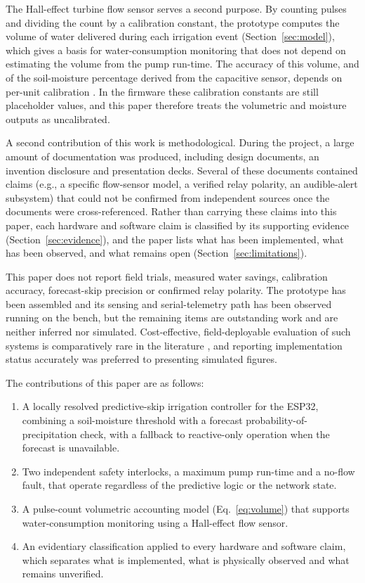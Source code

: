 \documentclass[conference]{IEEEtran}
\begin{document}
The Hall-effect turbine flow sensor serves a second purpose. By counting
pulses and dividing the count by a calibration constant, the prototype
computes the volume of water delivered during each irrigation event
(Section~\ref{sec:model}), which gives a basis for water-consumption
monitoring that does not depend on estimating the volume from the pump
run-time. The accuracy of this volume, and of the soil-moisture percentage
derived from the capacitive sensor, depends on per-unit calibration
\cite{adla2020laboratory,abdelmoneim2025calibration}. In the firmware
these calibration constants are still placeholder values, and this paper
therefore treats the volumetric and moisture outputs as uncalibrated.

A second contribution of this work is methodological. During the project, a
large amount of documentation was produced, including design documents, an
invention disclosure and presentation decks. Several of these documents
contained claims (e.g., a specific flow-sensor model, a verified relay
polarity, an audible-alert subsystem) that could not be confirmed from
independent sources once the documents were cross-referenced. Rather than
carrying these claims into this paper, each hardware and software claim is
classified by its supporting evidence (Section~\ref{sec:evidence}), and the
paper lists what has been implemented, what has been observed, and what
remains open (Section~\ref{sec:limitations}).

This paper does not report field trials, measured water savings, calibration
accuracy, forecast-skip precision or confirmed relay polarity. The prototype
has been assembled and its sensing and serial-telemetry path has been observed
running on the bench, but the remaining items are outstanding work and are
neither inferred nor simulated. Cost-effective, field-deployable evaluation of
such systems is comparatively rare in the literature \cite{jha2019comprehensive},
and reporting implementation status accurately was preferred to presenting
simulated figures.

The contributions of this paper are as follows:
\begin{enumerate}
\item A locally resolved predictive-skip irrigation controller for the ESP32,
combining a soil-moisture threshold with a forecast probability-of-precipitation
check, with a fallback to reactive-only operation when the forecast is
unavailable.
\item Two independent safety interlocks, a maximum pump run-time and a no-flow
fault, that operate regardless of the predictive logic or the network state.
\item A pulse-count volumetric accounting model (Eq.~\ref{eq:volume}) that
supports water-consumption monitoring using a Hall-effect flow sensor.
\item An evidentiary classification applied to every hardware and software
claim, which separates what is implemented, what is physically observed and
what remains unverified.
\end{enumerate}
\end{document}
